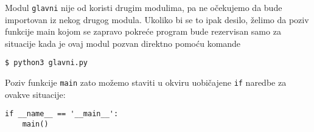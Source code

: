 \documentclass[a4paper]{article}
\begin{document}
Modul \texttt{glavni} nije od koristi drugim modulima, pa ne očekujemo da bude
importovan iz nekog drugog modula. Ukoliko bi se to ipak desilo, želimo da poziv
funkcije main kojom se zapravo pokreće program bude rezervisan samo za situacije
kada je ovaj modul pozvan direktno pomoću komande

\begin{verbatim}
$ python3 glavni.py
\end{verbatim}

Poziv funkcije \texttt{main} zato možemo staviti u okviru uobičajene \texttt{if}
naredbe za ovakve situacije:

\begin{verbatim}
if __name__ == '__main__':
    main()
\end{verbatim}
\end{document}

